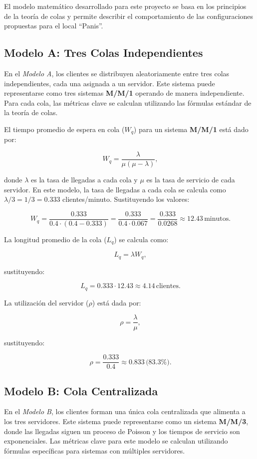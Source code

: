 \documentclass[a4paper,12pt]{article}
\begin{document}
El modelo matemático desarrollado para este proyecto se basa en los principios de la teoría de colas y permite describir el comportamiento de las configuraciones propuestas para el local “Panis”.

\subsection{Modelo A: Tres Colas Independientes}

En el \textit{Modelo A}, los clientes se distribuyen aleatoriamente entre tres colas independientes, cada una asignada a un servidor. Este sistema puede representarse como tres sistemas \textbf{M/M/1} operando de manera independiente. Para cada cola, las métricas clave se calculan utilizando las fórmulas estándar de la teoría de colas.

El tiempo promedio de espera en cola (\( W_q \)) para un sistema \textbf{M/M/1} está dado por:

\[\
W_q = \frac{\lambda}{\mu (\mu - \lambda)},
\]

donde \( \lambda \) es la tasa de llegadas a cada cola y \( \mu \) es la tasa de servicio de cada servidor. En este modelo, la tasa de llegadas a cada cola se calcula como \( \lambda / 3 = 1 / 3 = 0.333 \) clientes/minuto. Sustituyendo los valores:

\[\
W_q = \frac{0.333}{0.4 \cdot (0.4 - 0.333)} = \frac{0.333}{0.4 \cdot 0.067} = \frac{0.333}{0.0268} \approx 12.43 \, \text{minutos}.
\]

La longitud promedio de la cola (\( L_q \)) se calcula como:

\[\
L_q = \lambda W_q,
\]

sustituyendo:

\[\
L_q = 0.333 \cdot 12.43 \approx 4.14 \, \text{clientes}.
\]

La utilización del servidor (\( \rho \)) está dada por:

\[\
\rho = \frac{\lambda}{\mu},
\]

sustituyendo:

\[\
\rho = \frac{0.333}{0.4} \approx 0.833 \, \text{(83.3\%)}.
\]

\subsection{Modelo B: Cola Centralizada}

En el \textit{Modelo B}, los clientes forman una única cola centralizada que alimenta a los tres servidores. Este sistema puede representarse como un sistema \textbf{M/M/3}, donde las llegadas siguen un proceso de Poisson y los tiempos de servicio son exponenciales. Las métricas clave para este modelo se calculan utilizando fórmulas específicas para sistemas con múltiples servidores.
\end{document}

